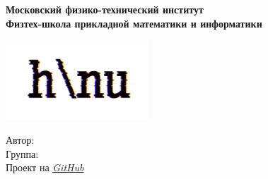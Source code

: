 \begin{titlepage}
	\clearpage\thispagestyle{empty}
	\centering

	\textbf{Московский физико-технический институт \\ Физтех-школа прикладной математики и информатики}
	\vspace{33ex}

	{\textbf{\FullCourseNameFirstPart}}

	\SemesterNumber
	\vspace{1ex}


	\includegraphics[width=0.4\textwidth]{images/logo_ltc.png}

	\begin{flushright}
		\noindent
		Автор: \href{\TGLink}{\textit{\AuthorInitials}}
		\\
		Группа: \textit{\AuthorAddInfo}
		\\
		Проект на \href{\GitHubLink}{\textit{GitHub}}
	\end{flushright}

	\vfill
	\CourseDate
	\pagebreak
\end{titlepage}
